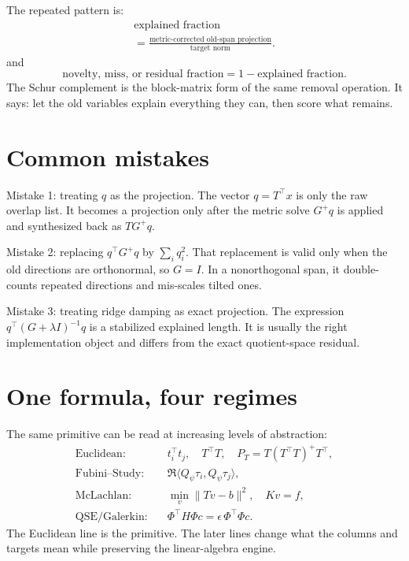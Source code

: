 \documentclass[10pt,twocolumn]{article}
\begin{document}
The repeated pattern is:
\begin{equation}
\boxed{
\begin{gathered}
\text{explained fraction}\\[-1mm]
=\frac{\text{metric-corrected old-span projection}}{\text{target norm}}.
\end{gathered}
}
\end{equation}
and
\begin{equation}
\boxed{
\text{novelty, miss, or residual fraction}
=1-\text{explained fraction}.
}
\end{equation}
The Schur complement is the block-matrix form of the same removal operation. It says: let the old variables explain everything they can, then score what remains.

\section{Common mistakes}

\begin{cautionbox}
Mistake 1: treating $q$ as the projection. The vector $q=T^\top x$ is only the raw overlap list. It becomes a projection only after the metric solve $G^+q$ is applied and synthesized back as $TG^+q$.
\end{cautionbox}

\begin{cautionbox}
Mistake 2: replacing $q^\top G^+q$ by $\sum_i q_i^2$. That replacement is valid only when the old directions are orthonormal, so $G=I$. In a nonorthogonal span, it double-counts repeated directions and mis-scales tilted ones.
\end{cautionbox}

\begin{cautionbox}
Mistake 3: treating ridge damping as exact projection. The expression $q^\top(G+\lambda I)^{-1}q$ is a stabilized explained length. It is usually the right implementation object and differs from the exact quotient-space residual.
\end{cautionbox}

\section{One formula, four regimes}

The same primitive can be read at increasing levels of abstraction:
\begin{align}
\text{Euclidean:}\quad
&t_i^\top t_j,\quad T^\top T,\quad P_T=T(T^\top T)^+T^\top,\\
\text{Fubini--Study:}\quad
&\Re\langle Q_\psi\tau_i,Q_\psi\tau_j\rangle,\\
\text{McLachlan:}\quad
&\min_v\|Tv-b\|^2,\quad K v=f,\\
\text{QSE/Galerkin:}\quad
&\Phi^\top H\Phi c=\epsilon\,\Phi^\top\Phi c.
\end{align}
The Euclidean line is the primitive. The later lines change what the columns and targets mean while preserving the linear-algebra engine.
\end{document}
